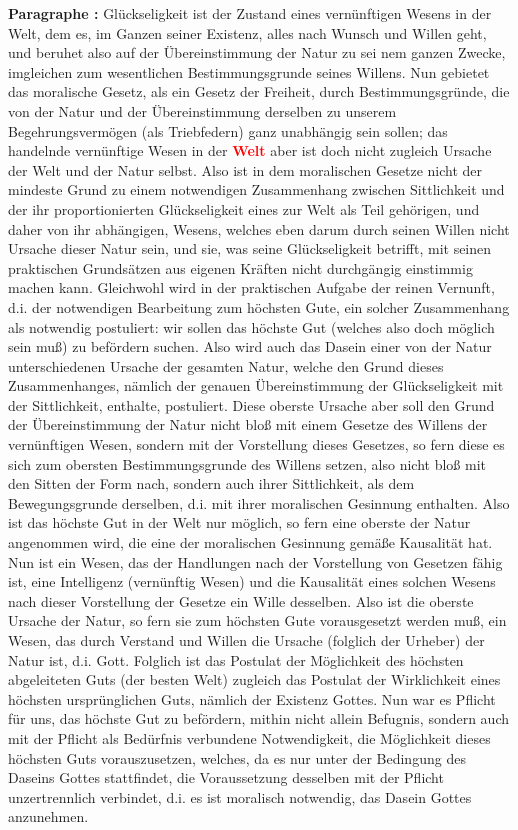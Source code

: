 \documentclass[a4paper,12pt,twoside]{book}
\newcommand{\match}[1]{\textcolor{red}{\textbf{#1}}}
\begin{document}
	\noindent\textbf{Paragraphe : }
	Glückseligkeit ist der Zustand eines vernünftigen Wesens in der Welt, dem es, im Ganzen seiner Existenz, alles nach Wunsch und Willen geht, und beruhet also auf der Übereinstimmung der Natur zu sei nem ganzen Zwecke, imgleichen zum wesentlichen Bestimmungsgrunde seines Willens. Nun gebietet das moralische Gesetz, als ein Gesetz der Freiheit, durch Bestimmungsgründe, die von der Natur und der Übereinstimmung derselben zu unserem Begehrungsvermögen (als Triebfedern) ganz unabhängig sein sollen; das handelnde vernünftige Wesen in der \match{Welt} aber ist doch nicht zugleich Ursache der Welt und der Natur selbst. Also ist in dem moralischen Gesetze nicht der mindeste Grund zu einem notwendigen Zusammenhang zwischen Sittlichkeit und der ihr proportionierten Glückseligkeit eines zur Welt als Teil gehörigen, und daher von ihr abhängigen, Wesens, welches eben darum durch seinen Willen nicht Ursache dieser Natur sein, und sie, was seine Glückseligkeit betrifft, mit seinen praktischen Grundsätzen aus eigenen Kräften nicht durchgängig einstimmig machen kann. Gleichwohl wird in der praktischen Aufgabe der reinen Vernunft, d.i. der notwendigen Bearbeitung zum höchsten Gute, ein solcher Zusammenhang als notwendig postuliert: wir sollen das höchste Gut (welches also doch möglich sein muß) zu befördern suchen. Also wird auch das Dasein einer von der Natur unterschiedenen Ursache der gesamten Natur, welche den Grund dieses Zusammenhanges, nämlich der genauen Übereinstimmung der Glückseligkeit mit der Sittlichkeit, enthalte, postuliert. Diese oberste Ursache aber soll den Grund der Übereinstimmung der Natur nicht bloß mit einem Gesetze des Willens der vernünftigen Wesen, sondern  mit der Vorstellung dieses Gesetzes, so fern diese es sich zum obersten Bestimmungsgrunde des Willens setzen, also nicht bloß mit den Sitten der Form nach, sondern auch ihrer Sittlichkeit, als dem Bewegungsgrunde derselben, d.i. mit ihrer moralischen Gesinnung enthalten. Also ist das höchste Gut in der Welt nur möglich, so fern eine oberste der Natur angenommen wird, die eine der moralischen Gesinnung gemäße Kausalität hat. Nun ist ein Wesen, das der Handlungen nach der Vorstellung von Gesetzen fähig ist, eine Intelligenz (vernünftig Wesen) und die Kausalität eines solchen Wesens nach dieser Vorstellung der Gesetze ein Wille desselben. Also ist die oberste Ursache der Natur, so fern sie zum höchsten Gute vorausgesetzt werden muß, ein Wesen, das durch Verstand und Willen die Ursache (folglich der Urheber) der Natur ist, d.i. Gott. Folglich ist das Postulat der Möglichkeit des höchsten abgeleiteten Guts (der besten Welt) zugleich das Postulat der Wirklichkeit eines höchsten ursprünglichen Guts, nämlich der Existenz Gottes. Nun war es Pflicht für uns, das höchste Gut zu befördern, mithin nicht allein Befugnis, sondern auch mit der Pflicht als Bedürfnis verbundene Notwendigkeit, die Möglichkeit dieses höchsten Guts vorauszusetzen, welches, da es nur unter der Bedingung des Daseins Gottes stattfindet, die Voraussetzung desselben mit der Pflicht unzertrennlich verbindet, d.i. es ist moralisch notwendig, das Dasein Gottes anzunehmen. 
	
\end{document}
